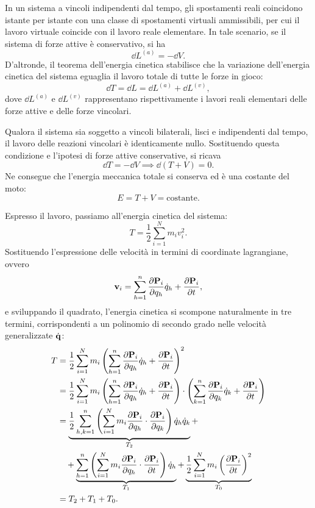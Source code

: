 In un sistema a vincoli indipendenti dal tempo, gli spostamenti reali coincidono istante per istante con una classe di spostamenti virtuali ammissibili, per cui il lavoro virtuale coincide con il lavoro reale elementare. In tale scenario, se il sistema di forze attive è conservativo, si ha
\begin{equation*}
    \dd{L}^{(a)} = -\dd{V}.
\end{equation*}
D'altronde, il teorema dell'energia cinetica stabilisce che la variazione dell'energia cinetica del sistema eguaglia il lavoro totale di tutte le forze in gioco:
\begin{equation*}
    \dd{T} = \dd{L} = \dd{L}^{(a)} + \dd{L}^{(v)},
\end{equation*}
dove $\dd{L}^{(a)}$ e $\dd{L}^{(v)}$ rappresentano rispettivamente i lavori reali elementari delle forze attive e delle forze vincolari. 

Qualora il sistema sia soggetto a vincoli bilaterali, lisci e indipendenti dal tempo, il lavoro delle reazioni vincolari è identicamente nullo. Sostituendo questa condizione e l'ipotesi di forze attive conservative, si ricava
\begin{equation*}
    \dd{T} = -\dd{V} \implies \dd{(T + V)} = 0.
\end{equation*}
Ne consegue che l'energia meccanica totale si conserva ed è una costante del moto:
\begin{equation*}
    E = T + V = \text{costante}.
\end{equation*}

Espresso il lavoro, passiamo all'energia cinetica del sistema:
\begin{equation*}
    T = \frac{1}{2} \sum_{i=1}^N m_i v_i^2.
\end{equation*}
Sostituendo l'espressione delle velocità in termini di coordinate lagrangiane, ovvero 
\begin{equation*}
    \vb{v}_i = \sum_{h=1}^n \pdv{\vb{P}_i}{q_h} \dot{q}_h + \pdv{\vb{P}_i}{t},
\end{equation*}
e sviluppando il quadrato, l'energia cinetica si scompone naturalmente in tre termini, corrispondenti a un polinomio di secondo grado nelle velocità generalizzate $\dot{\vb{q}}$:
\begin{align*}
    T &= \frac{1}{2} \sum_{i=1}^N m_i \left( \sum_{h=1}^n \pdv{\vb{P}_i}{q_h} \dot{q}_h + \pdv{\vb{P}_i}{t} \right)^2 \\
    &= \frac{1}{2} \sum_{i=1}^N m_i \left( \sum_{h=1}^n \pdv{\vb{P}_i}{q_h} \dot{q}_h + \pdv{\vb{P}_i}{t} \right) \cdot \left( \sum_{k=1}^n \pdv{\vb{P}_i}{q_k} \dot{q}_k + \pdv{\vb{P}_i}{t} \right) \\
    &= \underbrace{\frac{1}{2} \sum_{h,k=1}^n \left( \sum_{i=1}^N m_i \pdv{\vb{P}_i}{q_h} \cdot \pdv{\vb{P}_i}{q_k} \right) \dot{q}_h \dot{q}_k}_{T_2} + \\
    &\quad + \underbrace{\sum_{h=1}^n \left( \sum_{i=1}^N m_i \pdv{\vb{P}_i}{q_h} \cdot \pdv{\vb{P}_i}{t} \right) \dot{q}_h}_{T_1} + \underbrace{\frac{1}{2} \sum_{i=1}^N m_i \left(\pdv{\vb{P}_i}{t}\right)^2}_{T_0}\\
    &= T_2 + T_1 + T_0.
\end{align*}

